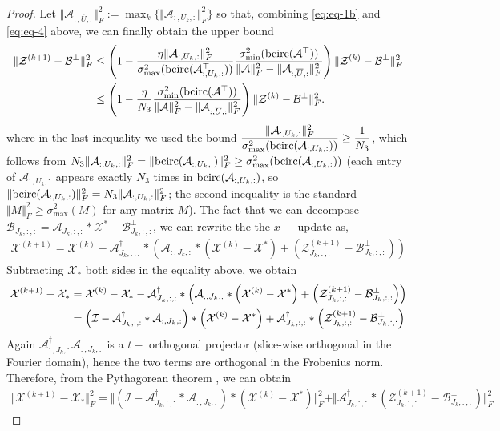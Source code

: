 \documentclass[11pt]{article}
\def\fm#1{\mathcal{#1}}
\def \a#1{\fm A_{:, #1, :}}
\def \b#1{\fm B_{#1, :, :}}
\def \ai#1{\fm A_{#1, :, :}}
\def \z#1#2{\fm Z^{(#1)}_{#2, :, :}}
\def \bp#1{\fm B^{\perp}_{#1, :, :}}
\def \x#1{\fm X^{(#1)}}
\begin{document}
\begin{proof}
Let $\Vert \a{\overline{U}} \Vert_F^2 := \max_k \{ \Vert \a{U_k}\Vert_F^2\}$ so that, combining \eqref{eq:eq-1b} and  \eqref{eq:eq-4} above, we can finally obtain the upper bound
\begin{align}
     \Vert   \fm Z^{(k+1)} - \fm B^\perp  \Vert_F^2  & \leq  \left( 1 - \frac{\eta \Vert \a{U_k} \Vert_F^2}{ \sigma_{\max}^2(\bcirc(\a{U_k}^\top)) } \frac{\sigma_{\min}^2(\bcirc(\fm A^\top))}{\Vert \fm A \Vert_F^2 - \Vert \a{\overline{U}} \Vert_F^2}   \right) \Vert  \fm Z^{(k)} - \fm B^\perp \Vert_F^2  \notag \\
     & \leq \left( 1 - \frac{\eta}{N_3}  \frac{\sigma_{\min}^2(\bcirc(\fm A^\top))}{\Vert \fm A \Vert_F^2 - \Vert \a{\overline{U}} \Vert_F^2}   \right) \Vert  \fm Z^{(k)} - \fm B^\perp \Vert_F^2 .
\end{align}
where in the last inequality we used the bound
$\dfrac{\Vert \a{U_k}\Vert_F^2}{\sigma_{\max}^2(\bcirc(\a{U_k}))} \geq \dfrac{1}{N_3}$,
which follows from $N_3\Vert \a{U_k}\Vert_F^2 = \Vert\bcirc(\a{U_k})\Vert_F^2 \geq \sigma_{\max}^2(\bcirc(\a{U_k}))$
(each entry of $\a{U_k}$ appears exactly $N_3$ times in $\bcirc(\a{U_k})$, so
$\Vert\bcirc(\a{U_k})\Vert_F^2 = N_3\Vert \a{U_k}\Vert_F^2$; the second inequality is
the standard $\Vert M\Vert_F^2\geq\sigma_{\max}^2(M)$ for any matrix $M$). The fact that  we can decompose $\b{J_k} = \ai{J_k}*\fm X^\ast + \bp{J_k} $, we can rewrite the the $x-$ update as,
\begin{align*}
   \fm X^{(k+1)} = \x k - \ai{J_k}^\dagger * \left( \a{J_k} *\left(\x k - \fm X^\ast \right) + \left(\z{k+1}{J_k} - \bp{J_k}  \right)\right)
\end{align*}
Subtracting $\fm X_\ast$  both sides  in the equality above, we obtain
\begin{align}
   \x {k+1} - \fm X_\ast  & =  \x{k} - \fm X_\ast  - \ai{J_k}^\dagger * \left( \a{J_k} *\left(\x k - \fm X^\ast \right) + \left(\z{k+1}{J_k} - \bp{J_k}  \right)\right) \notag\\
   & =  \left( \fm I - \ai{J_k}^\dagger *  \a{J_k} \right) *\left(\x k - \fm X^\ast   \right) +  \ai{J_k}^\dagger* \left(\z{k+1}{J_k} - \bp{J_k}  \right)
\end{align}
Again $\a{J_k}^\dagger \a{J_k}$ is a $t-$ orthogonal projector  (slice-wise  orthogonal in the Fourier  domain), hence the two terms are orthogonal in the Frobenius norm. Therefore,  from the  Pythagorean theorem , we can obtain
\begin{align}
    \Vert \x{k+1} - \fm X_\ast \Vert_F^2 = \Vert \left( \fm I - \ai{J_k}^\dagger *  \a{J_k} \right) *\left(\x k - \fm X^\ast   \right) \Vert_F^2  +  \Vert  \ai{J_k}^\dagger* \left(\z{k+1}{J_k} - \bp{J_k}  \right) \Vert_F^2  \label{eq:eq-5}

\end{align}
\end{proof}
\end{document}
